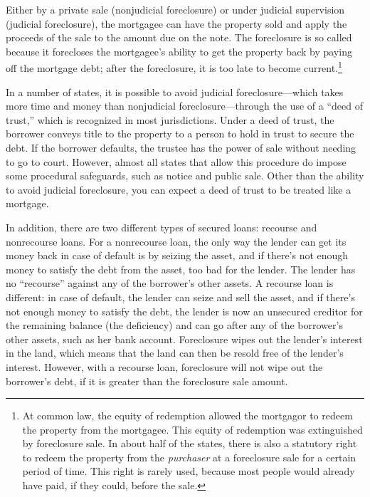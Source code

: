 Either by a private sale (nonjudicial foreclosure) or under judicial supervision
(judicial foreclosure), the mortgagee can have the property sold and apply the
proceeds of the sale to the amount due on the note.  The foreclosure is so
called because it forecloses the mortgagee's ability to get the property back
by paying off the mortgage debt; after the foreclosure, it is too late to
become current.\footnote{At common law, the equity of redemption allowed the
mortgagor to redeem the property from the mortgagee.  This equity of redemption
was extinguished by foreclosure sale. In about half of the states, there is
also a statutory right to redeem the property from the \textit{purchaser} at a
foreclosure sale for a certain period of time.  This right is rarely used,
because most people would already have paid, if they could, before the sale.}

In a number of states, it is possible to avoid judicial foreclosure---which
takes more time and money than nonjudicial foreclosure---through the use of a
``deed of trust,'' which is recognized in most jurisdictions.  Under a deed of
trust, the borrower conveys title to the property to a person to hold in trust
to secure the debt.  If the borrower defaults, the trustee has the power of
sale without needing to go to court.  However, almost all states that allow
this procedure do impose some procedural safeguards, such as notice and public
sale.  Other than the ability to avoid judicial foreclosure, you can expect a
deed of trust to be treated like a mortgage.

In addition, there are two different types of secured loans: recourse and
nonrecourse loans.  For a nonrecourse loan, the only way the lender can get its
money back in case of default is by seizing the asset, and if there's not
enough money to satisfy the debt from the asset, too bad for the lender.  The
lender has no ``recourse'' against any of the borrower's other assets.  A
recourse loan is different: in case of default, the lender can seize and sell
the asset, and if there's not enough money to satisfy the debt, the lender is
now an unsecured creditor for the remaining balance (the deficiency) and can go
after any of the borrower's other assets, such as her bank account. 
Foreclosure wipes out the lender's interest in the land, which means that the
land can then be resold free of the lender's interest.  However, with a
recourse loan, foreclosure will not wipe out the borrower's debt, if it is
greater than the foreclosure sale amount.  

